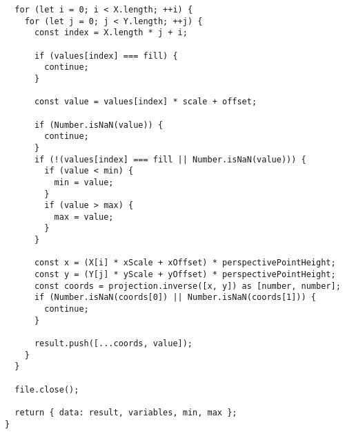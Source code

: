 \begin{verbatim}
  for (let i = 0; i < X.length; ++i) {
    for (let j = 0; j < Y.length; ++j) {
      const index = X.length * j + i;

      if (values[index] === fill) {
        continue;
      }

      const value = values[index] * scale + offset;

      if (Number.isNaN(value)) {
        continue;
      }
      if (!(values[index] === fill || Number.isNaN(value))) {
        if (value < min) {
          min = value;
        }
        if (value > max) {
          max = value;
        }
      }

      const x = (X[i] * xScale + xOffset) * perspectivePointHeight;
      const y = (Y[j] * yScale + yOffset) * perspectivePointHeight;
      const coords = projection.inverse([x, y]) as [number, number];
      if (Number.isNaN(coords[0]) || Number.isNaN(coords[1])) {
        continue;
      }

      result.push([...coords, value]);
    }
  }

  file.close();

  return { data: result, variables, min, max };
}

\end{verbatim}
